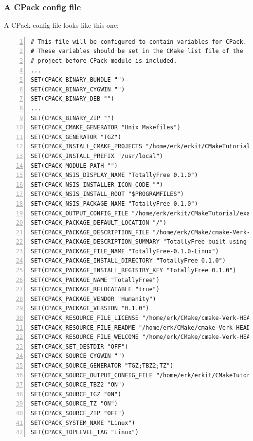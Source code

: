 \documentclass[compress,slidestop,table
              ]
               {beamer}
\begin{document}
\begin{frame}
\frametitle{A CPack config file}
A CPack config file looks like this one:
\begin{lstlisting}[basicstyle=\scriptsize,numbers=left,breaklines=true]
# This file will be configured to contain variables for CPack.
# These variables should be set in the CMake list file of the
# project before CPack module is included.
...
SET(CPACK_BINARY_BUNDLE "")
SET(CPACK_BINARY_CYGWIN "")
SET(CPACK_BINARY_DEB "")
...
SET(CPACK_BINARY_ZIP "")
SET(CPACK_CMAKE_GENERATOR "Unix Makefiles")
SET(CPACK_GENERATOR "TGZ")
SET(CPACK_INSTALL_CMAKE_PROJECTS "/home/erk/erkit/CMakeTutorial/examples/build;TotallyFree;ALL;/")
SET(CPACK_INSTALL_PREFIX "/usr/local")
SET(CPACK_MODULE_PATH "")
SET(CPACK_NSIS_DISPLAY_NAME "TotallyFree 0.1.0")
SET(CPACK_NSIS_INSTALLER_ICON_CODE "")
SET(CPACK_NSIS_INSTALL_ROOT "$PROGRAMFILES")
SET(CPACK_NSIS_PACKAGE_NAME "TotallyFree 0.1.0")
SET(CPACK_OUTPUT_CONFIG_FILE "/home/erk/erkit/CMakeTutorial/examples/build/CPackConfig.cmake")
SET(CPACK_PACKAGE_DEFAULT_LOCATION "/")
SET(CPACK_PACKAGE_DESCRIPTION_FILE "/home/erk/CMake/cmake-Verk-HEAD/share/cmake-2.8/Templates/CPack.GenericDescription.txt")
SET(CPACK_PACKAGE_DESCRIPTION_SUMMARY "TotallyFree built using CMake")
SET(CPACK_PACKAGE_FILE_NAME "TotallyFree-0.1.0-Linux")
SET(CPACK_PACKAGE_INSTALL_DIRECTORY "TotallyFree 0.1.0")
SET(CPACK_PACKAGE_INSTALL_REGISTRY_KEY "TotallyFree 0.1.0")
SET(CPACK_PACKAGE_NAME "TotallyFree")
SET(CPACK_PACKAGE_RELOCATABLE "true")
SET(CPACK_PACKAGE_VENDOR "Humanity")
SET(CPACK_PACKAGE_VERSION "0.1.0")
SET(CPACK_RESOURCE_FILE_LICENSE "/home/erk/CMake/cmake-Verk-HEAD/share/cmake-2.8/Templates/CPack.GenericLicense.txt")
SET(CPACK_RESOURCE_FILE_README "/home/erk/CMake/cmake-Verk-HEAD/share/cmake-2.8/Templates/CPack.GenericDescription.txt")
SET(CPACK_RESOURCE_FILE_WELCOME "/home/erk/CMake/cmake-Verk-HEAD/share/cmake-2.8/Templates/CPack.GenericWelcome.txt")
SET(CPACK_SET_DESTDIR "OFF")
SET(CPACK_SOURCE_CYGWIN "")
SET(CPACK_SOURCE_GENERATOR "TGZ;TBZ2;TZ")
SET(CPACK_SOURCE_OUTPUT_CONFIG_FILE "/home/erk/erkit/CMakeTutorial/examples/build/CPackSourceConfig.cmake")
SET(CPACK_SOURCE_TBZ2 "ON")
SET(CPACK_SOURCE_TGZ "ON")
SET(CPACK_SOURCE_TZ "ON")
SET(CPACK_SOURCE_ZIP "OFF")
SET(CPACK_SYSTEM_NAME "Linux")
SET(CPACK_TOPLEVEL_TAG "Linux")
\end{lstlisting}
\end{frame}
\end{document}

